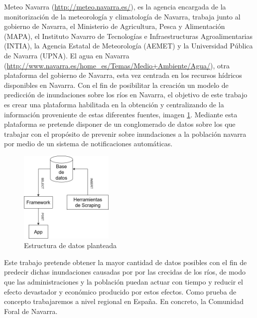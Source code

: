 \newline
Meteo Navarra (\url{http://meteo.navarra.es/}), es la agencia encargada de la  monitorización de la meteorología y climatología de Navarra, trabaja junto al gobierno de Navarra, el Ministerio de Agricultura, Pesca y Alimentación (MAPA), el Instituto Navarro de Tecnologías e Infraestructuras Agroalimentarias (INTIA), la Agencia Estatal de Meteorología (AEMET) y la Universidad Pública de Navarra (UPNA).\newline
\newline
El agua en Navarra (\url{http://www.navarra.es/home_es/Temas/Medio+Ambiente/Agua/}), otra plataforma del gobierno de Navarra, esta vez centrada en los recursos hídricos disponibles en Navarra.\newline
\newline
Con el fin de posibilitar la creación un modelo de predicción de inundaciones sobre los ríos en Navarra, el objetivo de este trabajo es crear una plataforma habilitada en la obtención y centralizando de la información proveniente de estas diferentes fuentes, imagen \ref{fig:ej31}. Mediante esta plataforma se pretende disponer de un conglomerado de datos sobre los que trabajar con el propósito de prevenir sobre inundaciones a la población navarra por medio de un sistema de notificaciones automáticas.\newline
\newline

\begin{figure} [H]
	\centering
	\includegraphics[width=0.4\textwidth]{fig/estructura_general.png}
	\caption[Estructura de datos planteada]{Estructura de datos planteada}
	\label{fig:ej31}
\end{figure}

Este trabajo pretende obtener la mayor cantidad de datos posibles con el fin de predecir dichas inundaciones causadas por por las crecidas de los ríos, de modo que las administraciones y la población puedan actuar con tiempo y reducir el efecto devastador y económico producido por estos efectos. Como prueba de concepto trabajaremos a nivel regional en España. En concreto, la Comunidad Foral de Navarra.



